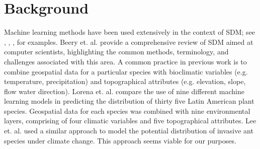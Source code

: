 \section{Background}

Machine learning methods have been used extensively in the context of SDM; see \cite{vincenzi2011application}, \cite{jin2012predicting}, \cite{jackson2015citizen}, \cite{aertsen2010comparison} for examples. Beery et. al. \cite{beery2021species} provide a comprehensive review of SDM aimed at computer scientists, highlighting the common methods, terminology, and challenges associated with this area.
A common practice in previous work is to combine geospatial data for a particular species with bioclimatic variables (e.g. temperature, precipitation) and topographical attributes (e.g. elevation, slope, flow water direction). Lorena et. al. \cite{lorena2011comparing} compare the use of nine different machine learning models in predicting the distribution of thirty five Latin American plant species. Geospatial data for each species was combined with nine environmental layers, comprising of four climatic variables and five topographical attributes. Lee et. al. \cite{lee2022spatial} used a similar approach to model the potential distribution of invasive ant species under climate change. This approach seems viable for our purposes.
